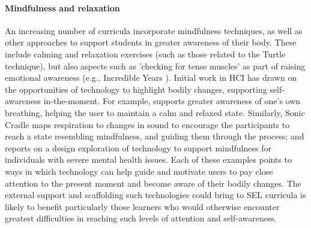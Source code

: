 \documentclass[prodmode,acmtochi]{acmsmall}
\begin{document}
%





\paragraph{Mindfulness and relaxation}
An increasing number of curricula incorporate mindfulness techniques, as well as other approaches to support students in greater awareness of their body. These include calming and relaxation exercises (such as those related to the Turtle technique), but also aspects such as 'checking for tense muscles' as part of raising emotional awareness (e.g., Incredible Years \cite{Webster-Stratton2004}). Initial work in HCI has drawn on the opportunities of technology to highlight bodily changes, supporting self-awareness in-the-moment. For example,  supports greater awareness of one's own breathing, helping the user to maintain a calm and relaxed state. 
Similarly, Sonic Cradle maps respiration to changes in sound to encourage the participants to reach a state resembling mindfulness, and guiding them through the process; and  reports on a design exploration of technology to support mindfulness for individuals with severe mental health issues. Each of these examples points to ways in which technology can help guide and motivate users to pay close attention to the present moment and become aware of their bodily changes. The external support and scaffolding such technologies could bring to SEL curricula is likely to benefit particularly those learners who would otherwise encounter greatest difficulties in reaching such levels of attention and self-awareness. 


\end{document}
